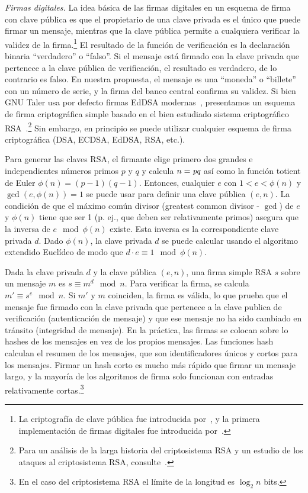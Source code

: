 \documentclass[a4paper,10pt]{article} %
\begin{document}
\emph{Firmas digitales.} La idea básica de las firmas digitales en un esquema
de firma con clave pública es que el propietario de una clave privada es el
único que puede firmar un mensaje, mientras que la clave pública permite a
cualquiera verificar la validez de la firma.\footnote{La criptografía de clave
pública fue introducida por~\citet{Diffie}, y la primera implementación de
firmas digitales fue introducida por~\citet{Rivest}.} El resultado de la
función de verificación es la declaración binaria ``verdadero'' o ``falso''. Si el
mensaje está firmado con la clave privada que pertenece a la clave pública de
verificación, el resultado es verdadero, de lo contrario es falso. En nuestra
propuesta, el mensaje es una ``moneda'' o ``billete'' con un número de serie, y la
firma del banco central confirma su validez. Si bien GNU Taler usa por defecto
firmas EdDSA modernas~\cite[véase][]{Bernstein2012}, presentamos un esquema de
firma criptográfica simple basado en el bien estudiado sistema criptográfico
RSA~\cite{Rivest}.\footnote{Para un análisis de la larga historia del
criptosistema RSA y un estudio de los ataques al criptosistema RSA,
consulte~\citet{Boneh}.} Sin embargo, en principio se puede utilizar cualquier
esquema de firma criptográfica (DSA, ECDSA, EdDSA, RSA, etc.).

Para generar las claves RSA, el firmante elige primero dos grandes e
independientes números primos $p$ y $q$ y calcula $n = \emph{pq}$
así como la función totient de Euler
$\phi(n) = (p - 1)(q - 1)$.
Entonces, cualquier $e$ con $1 < e < \phi(n)$ y
$\gcd(e, \phi(n)) = 1$ se puede usar para
definir una clave pública $(e,n)$. La condición de que el
máximo común divisor (greatest common divisor - $\gcd$) de $e$ y
$\phi(n)$ tiene que ser 1 (p. ej., que deben ser
relativamente primos) asegura que la inversa de
$e \mod \phi(n)$ existe.
Esta inversa es la
correspondiente clave privada $d$. Dado $\phi(n)$, la clave
privada $d$ se puede calcular usando el algoritmo extendido
Euclídeo de modo que
$d \cdot e \equiv 1 \mod \phi(n)$.

Dada la clave privada $d$ y la clave pública $(e, n)$, una firma simple RSA
$s$ sobre un mensaje $m$ es
$s \equiv m^{d} \mod n$.
Para verificar la firma, se calcula
$m' \equiv s^{e} \mod n$.
Si $m'$ y $m$ coinciden, la firma es válida, lo que prueba que el
mensaje fue firmado con la clave privada que pertenece a la clave
publica de verificación (autenticación de mensaje) y que ese mensaje no
ha sido cambiado en tránsito (integridad de mensaje). En la práctica,
las firmas se colocan sobre lo hashes de los mensajes en vez de los
propios mensajes. Las funciones hash calculan el resumen de los
mensajes, que son identificadores únicos y cortos para los mensajes.
Firmar un hash corto es mucho más rápido que firmar un mensaje largo, y
la mayoría de los algoritmos de firma solo funcionan con entradas
relativamente cortas.\footnote{En el caso del criptosistema RSA el
límite de la longitud es $\log_{2}n$ bits.}
\end{document}
